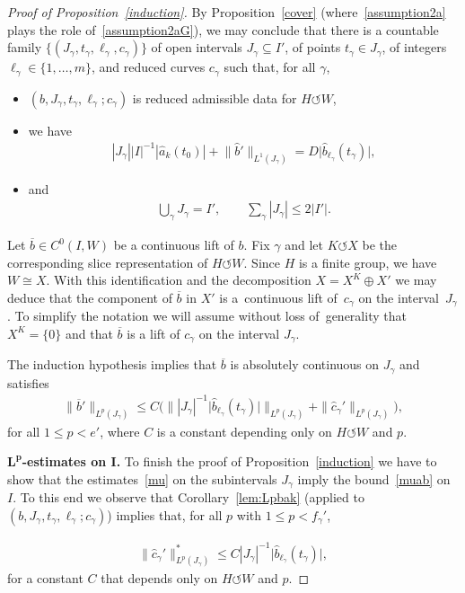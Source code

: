 \documentclass[11pt]{article}
\numberwithin{equation}{section}
\numberwithin{equation}{section}
\def\ga{\gamma}
\def\ol{\overline}
\def\acts{\circlearrowleft}
\begin{document}
\begin{proof}[Proof of Proposition~\ref{induction}]
By Proposition~\ref{cover} (where~\eqref{assumption2a} plays the role of~\eqref{assumption2aG}),
we may conclude that there is a countable family $\{(J_\ga,t_\ga,\ell_\ga,c_\ga)\}$ of open intervals $J_\ga \subseteq I'$,
of points $t_\ga \in J_\ga$,
of integers $\ell_\ga \in \{1, \dots,m\}$,
and reduced curves $c_\ga$ such that, for all $\ga$,
\begin{itemize}
	\item $(b,J_\ga,t_\ga,\ell_\ga;c_\ga)$ is reduced admissible data for $H \acts W$,
	\item we have
	\begin{gather}
 |J_\ga| |I|^{-1} {|\hat a_k(t_0)|} + \big\|\hat b'\big\|_{L^1 (J_\ga)} =
 D \big|\hat b_{\ell_\ga}(t_\ga)\big|, \label{Jba}
\end{gather}
\item and
\begin{gather}
	\bigcup_\ga J_\ga = I', \qquad \sum_\ga |J_\ga| \le 2 |I'|. \label{Jga}
\end{gather}
\end{itemize}


Let $\ol b \in C^0(I,W)$ be a continuous lift of $b$.
Fix $\ga$ and let $K \acts X$ be the corresponding slice representation of $H \acts W$.
Since $H$ is a finite group, we have $W \cong X$. With this identification and the decomposition $X = X^K \oplus X'$
we may deduce that the component of $\ol b$ in $X'$
is a~continuous lift of~$c_\ga$ on the interval~$J_\ga$.
To simplify the notation we will assume without loss of~generality that $X^{K} = \{0\}$ and that
$\ol b$ is a lift of $c_\ga$ on the interval $J_\ga$.

The induction hypothesis implies that
$\ol b$ is absolutely continuous on $J_\ga$ and satisfies
\begin{gather} \label{mu}
\big \|\ol b'\big\|_{L^p(J_\ga)} \le C \Big( \big\| |J_\ga|^{-1} {\big|\hat b_{\ell_\ga}(t_\ga)\big|} \big\|_{L^p (J_\ga)}
 + \|\hat c_{\ga}'\|_{L^p (J_\ga)}\Big),
\end{gather}
for all $1 \le p < e'$, where $C$ is a constant depending only on $H \acts W$ and $p$.


\medskip\noindent
{\bf $\boldsymbol{L^p}$-estimates on $\boldsymbol I$.}
To finish the proof of Proposition~\ref{induction} we have to show that the estimates~\eqref{mu}
on the subintervals $J_\ga$
imply the bound~\eqref{muab} on~$I$.
To this end we observe that Corollary~\ref{lem:Lpbak} (applied to $(b,J_\ga,t_\ga,\ell_\ga;c_\ga)$)
implies that,
for all $p$ with $1 \le p < f_\ga'$,
{\samepage\begin{gather} \label{eq:ctob}
 \|\hat c_{\ga}'\|^*_{L^p(J_\ga)}
 \le C |J_\ga|^{-1} \big|\hat b_{\ell_\ga} (t_\ga)\big|,
\end{gather}
for a constant $C$ that depends only on $H \acts W$ and $p$.

}
\end{proof}
\end{document}
